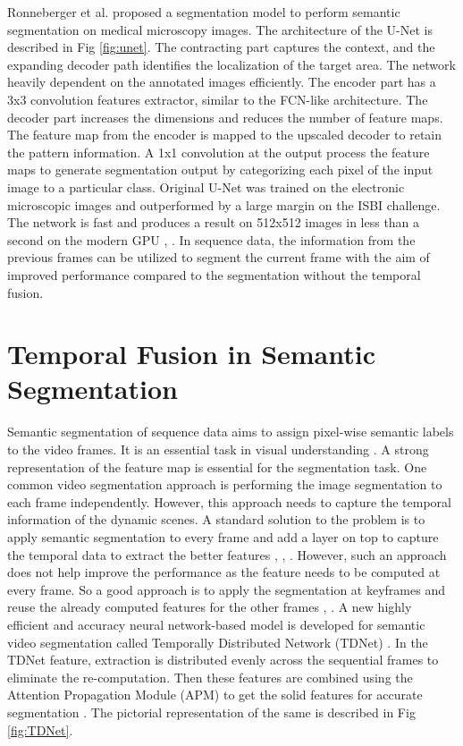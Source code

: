 	 Ronneberger et al. \cite{70_ronneberger2015u} proposed a segmentation model to perform semantic segmentation on medical microscopy images. The architecture of the U-Net is described in Fig \ref{fig:unet}. The contracting part captures the context, and the expanding decoder path identifies the localization of the target area. The network heavily dependent on the annotated images efficiently. The encoder part has a 3x3 convolution features extractor, similar to the FCN-like architecture. The decoder part increases the dimensions and reduces the number of feature maps. The feature map from the encoder is mapped to the upscaled decoder to retain the pattern information. A 1x1 convolution at the output process the feature maps to generate segmentation output by categorizing each pixel of the input image to a particular class. Original U-Net was trained on the electronic microscopic images and outperformed by a large margin on the ISBI challenge. The network is fast and produces a result on 512x512 images in less than a second on the modern GPU \cite{70_ronneberger2015u}, \cite{60_minaee2021image}. In sequence data, the information from the previous frames can be utilized to segment the current frame with the aim of improved performance compared to the segmentation without the temporal fusion. 
	 
    \section{Temporal Fusion in Semantic Segmentation}
    
	Semantic segmentation of sequence data aims to assign pixel-wise semantic labels to the video frames. It is an essential task in visual understanding \cite{72_jin2017video}. A strong representation of the feature map is essential for the segmentation task. One common video segmentation approach is performing the image segmentation to each frame independently. However, this approach needs to capture the temporal information of the dynamic scenes. A standard solution to the problem is to apply semantic segmentation to every frame and add a layer on top to capture the temporal data to extract the better features \cite{73_gadde2017semantic}, \cite{74_jin2017video}, \cite{75_nilsson2018semantic}. However, such an approach does not help improve the performance as the feature needs to be computed at every frame. So a good approach is to apply the segmentation at keyframes and reuse the already computed features for the other frames \cite{76_jain2019accel}, \cite{77_mahasseni2017budget}. A new highly efficient and accuracy neural network-based model is developed for semantic video segmentation called Temporally Distributed Network (TDNet) \cite{78_hu2020temporally}. In the TDNet feature, extraction is distributed evenly across the sequential frames to eliminate the re-computation. Then these features are combined using the Attention Propagation Module (APM) to get the solid features for accurate segmentation \cite{78_hu2020temporally}. The pictorial representation of the same is described in Fig \ref{fig:TDNet}. 
    
